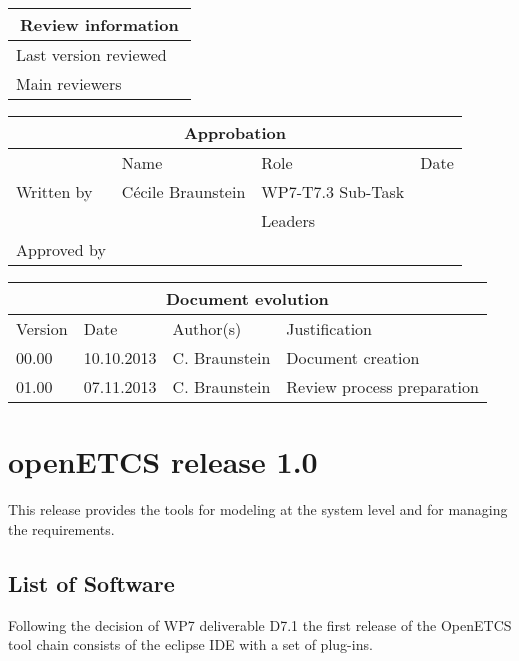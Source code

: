 \documentclass{openetcs_report}
\begin{document}
\begin{tabular}{|p{4.4cm}|p{8.7cm}|}
\hline
\multicolumn{2}{|c|}{Review information} \\
\hline
Last version reviewed &  \\
\hline
Main reviewers & \\
\hline
\end{tabular}

\begin{tabular}{|p{2.2cm}|p{4cm}|p{4cm}|p{2cm}|}
\hline
\multicolumn{4}{|c|}{Approbation} \\
\hline
  &  Name & Role & Date   \\
\hline  
Written by    &  Cécile Braunstein & WP7-T7.3 Sub-Task  & \\
&  & Leaders&\\
\hline
Approved by & &  & \\
\hline
\end{tabular}

\begin{tabular}{|p{2.2cm}|p{2cm}|p{3cm}|p{5cm}|}
\hline
\multicolumn{4}{|c|}{Document evolution} \\
\hline
Version &  Date & Author(s) & Justification  \\
\hline  
00.00 & 10.10.2013 & C. Braunstein  &  Document creation  \\
01.00 & 07.11.2013 & C. Braunstein  &  Review process preparation \\

\hline  
\end{tabular}
\newpage


\mainmatter
\chapter{openETCS release 1.0}

This release provides the tools for modeling at the system level and
for managing the requirements.


\section{List of Software}
Following the decision of WP7 deliverable D7.1 the first release of
the OpenETCS tool chain consists of the eclipse IDE with a set of plug-ins.
\end{document}
